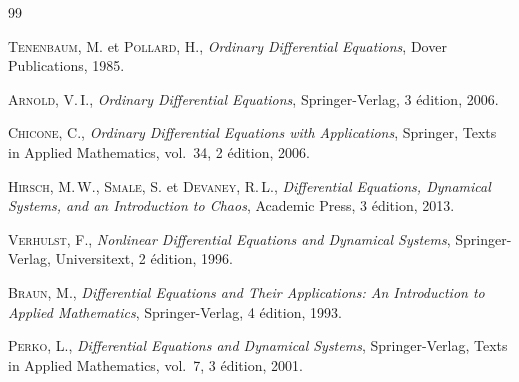 \documentclass[12pt,a4paper,openany]{book}
\theoremstyle{definition}
\theoremstyle{plain}
\theoremstyle{remark}
\begin{document}
\begin{thebibliography}{99}

\textsc{Tenenbaum}, M. et \textsc{Pollard}, H.,
\textit{Ordinary Differential Equations},
Dover Publications, 1985.

\textsc{Arnold}, V.\,I.,
\textit{Ordinary Differential Equations},
Springer-Verlag, 3 édition, 2006.

\textsc{Chicone}, C.,
\textit{Ordinary Differential Equations with Applications},
Springer, Texts in Applied Mathematics, vol.~34, 2 édition, 2006.

\textsc{Hirsch}, M.\,W., \textsc{Smale}, S. et \textsc{Devaney}, R.\,L.,
\textit{Differential Equations, Dynamical Systems, and an Introduction
to Chaos},
Academic Press, 3 édition, 2013.

\textsc{Verhulst}, F.,
\textit{Nonlinear Differential Equations and Dynamical Systems},
Springer-Verlag, Universitext, 2 édition, 1996.

\textsc{Braun}, M.,
\textit{Differential Equations and Their Applications:
An Introduction to Applied Mathematics},
Springer-Verlag, 4 édition, 1993.

\textsc{Perko}, L.,
\textit{Differential Equations and Dynamical Systems},
Springer-Verlag, Texts in Applied Mathematics, vol.~7,
3 édition, 2001.

\end{thebibliography}

\printindex
\end{document}
